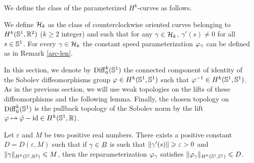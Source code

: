  
We define the class of the parameterized $H^k$-curves as follows. 

\begin{defn}
[{\bf $H^k$-curves}]\label{Hscurves}
We define $\mathcal{H}_k$ as the class  of counterclockwise oriented curves belonging to $H^k( \mathbb{S}^1, {\mathbb R}^2)$ ($k\geq 2$ integer)  and such that for any $\gamma \in \mathcal{H}_k$, $\gamma'(s) \neq 0$ for all $s \in \mathbb{S}^1$. 
For every $\gamma\in \mathcal{H}_k$ the constant speed parameterization $\varphi_\gamma$ can be defined as in Remark \ref{arc-len}. %
\end{defn}


\begin{rem}[{\bf reparameterizations}]
In this section, we denote by 	${\rm Diff}_0^k(\mathbb{S}^1)$ the connected component of identity of the Sobolev diffeomorphisms group  $\varphi\in H^k(\mathbb{S}^1,\mathbb{S}^1)$ such that $\varphi^{-1} \in H^k(\mathbb{S}^1,\mathbb{S}^1)$.
As in the previous section, we will use weak topologies on the lifts of these diffeomorphisms and the following lemma. Finally, the chosen topology on ${\rm Diff}_0^k(\mathbb{S}^1)$ is the pullback topology of the Sobolev norm by the lift  $\varphi \mapsto \tilde{\varphi} - \mathrm{id} \in H^k(\mathbb{S}^1,{\mathbb R})$.
\end{rem}

\begin{lem}\label{BoundedReparametrizations}
Let $\varepsilon$ and $M$ be two positive real numbers. There exists a positive constant $D = D(\varepsilon,M)$ such that 
if $\gamma \in B$ is such that $\| \gamma'(s) \| \geqslant \varepsilon >0$ and $\| \gamma \|_{H^k(\mathbb{S}^1,{\mathbb R}^2)} \leqslant M$, then the reparameterization $\varphi_\gamma$ satisfies
$ \| \varphi_\gamma \|_{H^k(\mathbb{S}^1,\mathbb{S}^1)} \leqslant D$. 
\end{lem}

